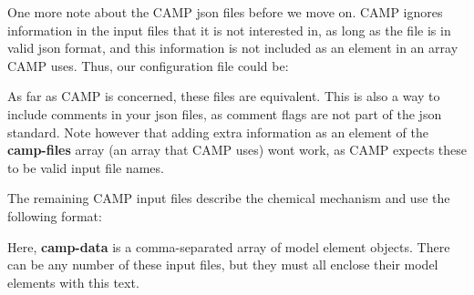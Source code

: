 One more note about the CAMP {\ttfamily json} files before we move on. CAMP ignores information in the input files that it is not interested in, as long as the file is in valid {\ttfamily json} format, and this information is not included as an element in an array CAMP uses. Thus, our configuration file could be\+: 
\begin{DoxyCode}{0}
\DoxyCodeLine{\{}
\DoxyCodeLine{  "{}camp-\/files"{} : [}
\DoxyCodeLine{  ],}
\DoxyCodeLine{  "{}change log"{} : [}
\DoxyCodeLine{  ]}
\DoxyCodeLine{\}}

\end{DoxyCode}
 As far as CAMP is concerned, these files are equivalent. This is also a way to include comments in your {\ttfamily json} files, as comment flags are not part of the {\ttfamily json} standard. Note however that adding extra information as an element of the {\bfseries{camp-\/files}} array (an array that CAMP uses) won\textquotesingle{}t work, as CAMP expects these to be valid input file names.

The remaining CAMP input files describe the chemical mechanism and use the following format\+: 
\begin{DoxyCode}{0}
\DoxyCodeLine{\{}
\DoxyCodeLine{  "{}camp-\/data"{} : [}
\DoxyCodeLine{}
\DoxyCodeLine{}
\DoxyCodeLine{  ]}
\DoxyCodeLine{\}}

\end{DoxyCode}
 Here, {\bfseries{camp-\/data}} is a comma-\/separated array of model element objects. There can be any number of these input files, but they must all enclose their model elements with this text.

